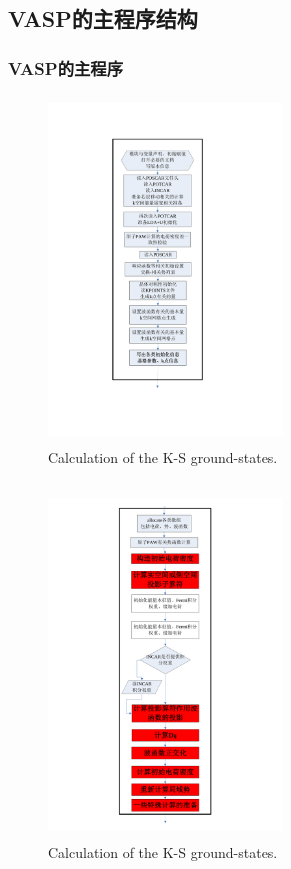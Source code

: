 \documentclass[cjk,slidestop,compress,mathserif,blue]{beamer}
\begin{document}
\subsection{\rm{VASP}的主程序结构}
\frame
{
	\frametitle{\textrm{VASP}的主程序}
\begin{figure}[h!]
\centering
\vspace*{-0.45in}
\includegraphics[height=3.62in,width=2.45in,viewport=160 118 395 755,clip]{Figures/VASP_main_Flow-1.pdf}
\caption{\tiny \textrm{Calculation of the K-S ground-states.}}%
\label{VASP_Follow-1}
\end{figure}
}

\frame
{
\frametitle{}
\begin{figure}[h!]
\centering
\vspace*{-0.65in}
\includegraphics[height=3.62in,width=2.45in,viewport=176 16 416 819,clip]{Figures/VASP_main_Flow-2.pdf}
\caption{\tiny \textrm{Calculation of the K-S ground-states.}}%
\label{VASP_Follow-2}
\end{figure}
}
\end{document}
